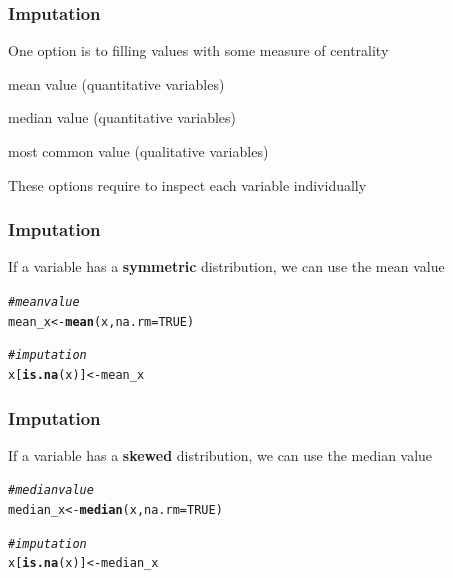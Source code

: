 \documentclass[12pt]{beamer}\usepackage[]{graphicx}\usepackage[]{color}
\makeatletter
\newcommand{\hlnum}[1]{\textcolor[rgb]{0.686,0.059,0.569}{#1}}%
\newcommand{\hlcom}[1]{\textcolor[rgb]{0.678,0.584,0.686}{\textit{#1}}}%
\newcommand{\hlstd}[1]{\textcolor[rgb]{0.345,0.345,0.345}{#1}}%
\newcommand{\hlkwb}[1]{\textcolor[rgb]{0.69,0.353,0.396}{#1}}%
\newcommand{\hlkwc}[1]{\textcolor[rgb]{0.333,0.667,0.333}{#1}}%
\newcommand{\hlkwd}[1]{\textcolor[rgb]{0.737,0.353,0.396}{\textbf{#1}}}%
\newenvironment{kframe}{%
 \def\at@end@of@kframe{}%
 \ifinner\ifhmode%
  \def\at@end@of@kframe{\end{minipage}}%
  \begin{minipage}{\columnwidth}%
 \fi\fi%
 \def\FrameCommand##1{\hskip\@totalleftmargin \hskip-\fboxsep
 \colorbox{shadecolor}{##1}\hskip-\fboxsep
     \hskip-\linewidth \hskip-\@totalleftmargin \hskip\columnwidth}%
 \MakeFramed {\advance\hsize-\width
   \@totalleftmargin\z@ \linewidth\hsize
   \@setminipage}}%
 {\par\unskip\endMakeFramed%
 \at@end@of@kframe}
\newenvironment{knitrout}{}{} %
\makeatother
\begin{document}
\begin{frame}
\frametitle{Imputation}

One option is to filling values with some measure of centrality
\bbi
  \item mean value (quantitative variables)
  \item median value (quantitative variables)
  \item most common value (qualitative variables)
\ei

\bigskip
These options require to inspect each variable individually
\eb

\end{frame}


\begin{frame}[fragile]
\frametitle{Imputation}

If a variable has a \textbf{symmetric} distribution, we can use the mean value
\begin{knitrout}\footnotesize
{}\color{fgcolor}\begin{kframe}
\begin{alltt}
\hlcom{# mean value}
\hlstd{mean_x} \hlkwb{<-} \hlkwd{mean}\hlstd{(x,} \hlkwc{na.rm} \hlstd{=} \hlnum{TRUE}\hlstd{)}

\hlcom{# imputation}
\hlstd{x[}\hlkwd{is.na}\hlstd{(x)]} \hlkwb{<-} \hlstd{mean_x}
\end{alltt}
\end{kframe}
\end{knitrout}

\end{frame}


\begin{frame}[fragile]
\frametitle{Imputation}

If a variable has a \textbf{skewed} distribution, we can use the median value
\begin{knitrout}\footnotesize
{}\color{fgcolor}\begin{kframe}
\begin{alltt}
\hlcom{# median value}
\hlstd{median_x} \hlkwb{<-} \hlkwd{median}\hlstd{(x,} \hlkwc{na.rm} \hlstd{=} \hlnum{TRUE}\hlstd{)}

\hlcom{# imputation}
\hlstd{x[}\hlkwd{is.na}\hlstd{(x)]} \hlkwb{<-} \hlstd{median_x}
\end{alltt}
\end{kframe}
\end{knitrout}

\end{frame}
\end{document}
